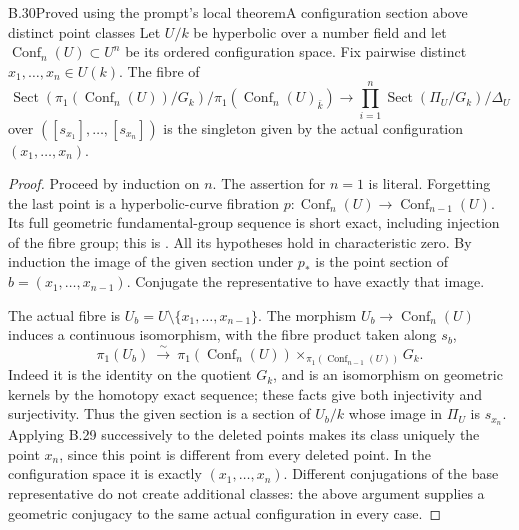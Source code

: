 \begin{statement}{B.30}{Proved using the prompt's local theorem}{A configuration section above distinct point classes}
Let $U/k$ be hyperbolic over a number field and let
$\operatorname{Conf}_n(U)\subset U^n$ be its ordered configuration
space.  Fix pairwise distinct $x_1,\ldots,x_n\in U(k)$.
The fibre of
\[
 \operatorname{Sect}(\pi_1(\operatorname{Conf}_n(U))/G_k)
       /\pi_1(\operatorname{Conf}_n(U)_{\bar k})
 \longrightarrow
 \prod_{i=1}^n\operatorname{Sect}(\Pi_U/G_k)/\Delta_U
\]
over $([s_{x_1}],\ldots,[s_{x_n}])$ is the singleton given by the
actual configuration $(x_1,\ldots,x_n)$.
\end{statement}
\begin{proof}
Proceed by induction on $n$.  The assertion for $n=1$ is literal.
Forgetting the last point is a hyperbolic-curve fibration
$p:\operatorname{Conf}_n(U)\to\operatorname{Conf}_{n-1}(U)$.
Its full geometric fundamental-group sequence is short exact,
including injection of the fibre group; this is
\cite[Proposition 2.2(i), with the total formation]{B_MochizukiTamagawa}.
All its hypotheses hold in characteristic zero.
By induction the image of the given section under $p_*$ is the
point section of $b=(x_1,\ldots,x_{n-1})$.
Conjugate the representative to have exactly that image.

The actual fibre is $U_b=U\setminus\{x_1,\ldots,x_{n-1}\}$.
The morphism $U_b\to\operatorname{Conf}_n(U)$ induces a continuous
isomorphism, with the fibre product taken along $s_b$,
\[
 \pi_1(U_b)\ \xrightarrow{\sim}\
 \pi_1(\operatorname{Conf}_n(U))
       \times_{\pi_1(\operatorname{Conf}_{n-1}(U))}G_k.
\]
Indeed it is the identity on the quotient $G_k$, and is an
isomorphism on geometric kernels by the homotopy exact sequence;
these facts give both injectivity and surjectivity.
Thus the given section is a section of $U_b/k$ whose image in
$\Pi_U$ is $s_{x_n}$.  Applying B.29 successively to the deleted
points makes its class uniquely the point $x_n$, since this point
is different from every deleted point.  In the configuration space
it is exactly $(x_1,\ldots,x_n)$.
Different conjugations of the base representative do not create
additional classes: the above argument supplies a geometric
conjugacy to the same actual configuration in every case.
\end{proof}

